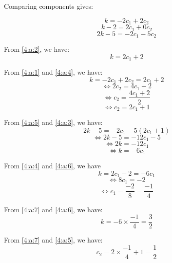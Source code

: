 \documentclass{article}
\begin{document}
\begin{enumerate}[label=({\alph*})]
            Comparing components gives:

            \begin{equation}
                k = -2c_{1} + 2c_{2} \label{4:a:1}
            \end{equation}
            \begin{equation}
                k - 2 = 2c_{1} + 0c_{2} \label{4:a:2}
            \end{equation}
            \begin{equation}
                2k - 5 = -2c_{1} - 5c_{2} \label{4:a:3}
            \end{equation}
            

            From \eqref{4:a:2}, we have:
            \begin{equation}
                k = 2c_{1} + 2 \label{4:a:4}
            \end{equation}

            From \eqref{4:a:1} and \eqref{4:a:4}, we have:
            \[k = -2c_{1} + 2c_{2} = 2c_{1} + 2\]
            \[\Leftrightarrow 2c_{2}  = 4c_{1} + 2\]
            \[\Leftrightarrow c_{2} = \frac{4c_{1} + 2}{2}\]
            \begin{equation}
                \Leftrightarrow c_{2} = 2c_{1} + 1 \label{4:a:5}
            \end{equation}

            From \eqref{4:a:5} and \eqref{4:a:3}, we have:
            \[2k - 5 = -2c_{1} -5(2c_{1} + 1)\]
            \[\Leftrightarrow 2k - 5 = -12c_{1} -5\]
            \[\Leftrightarrow 2k = -12c_{1}\]
            \begin{equation}
                \Leftrightarrow k = -6c_{1}  \label{4:a:6}
            \end{equation} 
            
            From \eqref{4:a:4} and \eqref{4:a:6}, we have
            \[k = 2c_{1} + 2 = -6c_{1}\]
            \[\Leftrightarrow 8c_{1} = -2\]
            \begin{equation}
                \Leftrightarrow c_{1} = \frac{-2}{8} = \frac{-1}{4} \label{4:a:7}
            \end{equation}

            From \eqref{4:a:7} and \eqref{4:a:6}, we have:
            \begin{equation}
                k = -6 \times \frac{-1}{4} = \frac{3}{2} \label{4:a:8}
            \end{equation}


            From \eqref{4:a:7} and \eqref{4:a:5}, we have:
            \begin{equation}
                c_{2} = 2 \times \frac{-1}{4} + 1 = \frac{1}{2} \label{4:a:9}
            \end{equation}


\end{enumerate}
\end{document}
